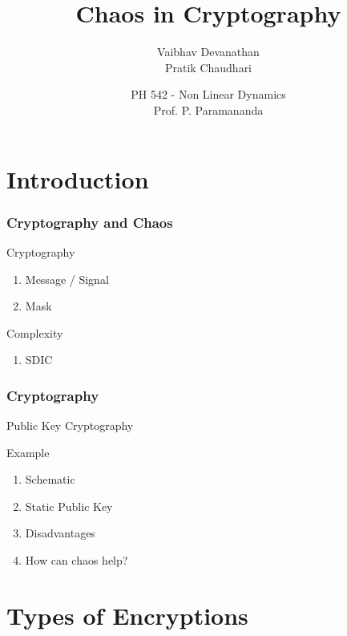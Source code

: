 \documentclass[xcolor=dvipsnames]{beamer}
\title{Chaos in Cryptography}
\author[Vaibhav and Pratik]{Vaibhav Devanathan\\[0.1in]Pratik Chaudhari}
\institute[IIT Bombay]{IIT Bombay}
\date[\today]{PH 542 - Non Linear Dynamics\\[0.1in]{\footnotesize Prof. P. Paramananda}}
\begin{document}
\begin{frame}
	\titlepage
\end{frame}

\section[Intro]{Introduction}
\begin{frame}
\frametitle{Cryptography and Chaos}
\begin{block}{Cryptography}
\end{block}

\begin{enumerate}
\item
Message / Signal
\newline
\item
Mask
\newline
\end{enumerate}

\begin{block}{Complexity}
\end{block}
\begin{enumerate}
\item
SDIC
\end{enumerate}
\end{frame}

\begin{frame}
\frametitle{Cryptography}
\begin{block}{Public Key Cryptography}
\end{block}
\vspace{0.2in}
\begin{block}{Example}
\end{block}
\begin{enumerate}
\item
Schematic
\newline
\item
Static Public Key
\newline
\item
Disadvantages
\newline
\item
How can chaos help?
\end{enumerate}
\end{frame}

\section[Types]{Types of Encryptions}
\end{document}
